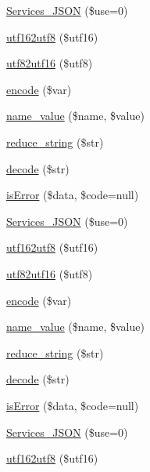 \begin{DoxyCompactItemize}
\hyperlink{class_services___j_s_o_n_abc84bd855fe129a4c68bcb68b4d17108}{Services\-\_\-\-J\-S\-O\-N} (\$use=0)
\item 
\hyperlink{class_services___j_s_o_n_aa7b1b36cd3a4995bbb60f5def6a216e2}{utf162utf8} (\$utf16)
\item 
\hyperlink{class_services___j_s_o_n_af9687bbf6bcddc9c847d608f9a1fa4c0}{utf82utf16} (\$utf8)
\item 
\hyperlink{class_services___j_s_o_n_acdf1c85111e34b3048d436228bf39819}{encode} (\$var)
\item 
\hyperlink{class_services___j_s_o_n_aa7f3e18209717e584f01f53a0325e9ff}{name\-\_\-value} (\$name, \$value)
\item 
\hyperlink{class_services___j_s_o_n_ae463a3baa44e95fa5b5151ab2334df1c}{reduce\-\_\-string} (\$str)
\item 
\hyperlink{class_services___j_s_o_n_a4afbb486f4a5ff5a8170c832f5997986}{decode} (\$str)
\item 
\hyperlink{class_services___j_s_o_n_a55ae0955466c3970507b122f3f5d1b38}{is\-Error} (\$data, \$code=null)
\item 
\hyperlink{class_services___j_s_o_n_abc84bd855fe129a4c68bcb68b4d17108}{Services\-\_\-\-J\-S\-O\-N} (\$use=0)
\item 
\hyperlink{class_services___j_s_o_n_aa7b1b36cd3a4995bbb60f5def6a216e2}{utf162utf8} (\$utf16)
\item 
\hyperlink{class_services___j_s_o_n_af9687bbf6bcddc9c847d608f9a1fa4c0}{utf82utf16} (\$utf8)
\item 
\hyperlink{class_services___j_s_o_n_acdf1c85111e34b3048d436228bf39819}{encode} (\$var)
\item 
\hyperlink{class_services___j_s_o_n_aa7f3e18209717e584f01f53a0325e9ff}{name\-\_\-value} (\$name, \$value)
\item 
\hyperlink{class_services___j_s_o_n_ae463a3baa44e95fa5b5151ab2334df1c}{reduce\-\_\-string} (\$str)
\item 
\hyperlink{class_services___j_s_o_n_a4afbb486f4a5ff5a8170c832f5997986}{decode} (\$str)
\item 
\hyperlink{class_services___j_s_o_n_a55ae0955466c3970507b122f3f5d1b38}{is\-Error} (\$data, \$code=null)
\item 
\hyperlink{class_services___j_s_o_n_abc84bd855fe129a4c68bcb68b4d17108}{Services\-\_\-\-J\-S\-O\-N} (\$use=0)
\item 
\hyperlink{class_services___j_s_o_n_aa7b1b36cd3a4995bbb60f5def6a216e2}{utf162utf8} (\$utf16)
\item 

\end{DoxyCompactItemize}
